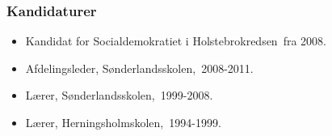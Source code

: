 \documentclass[11pt, a4paper]{awesome-cv}
\begin{document}
\begin{cvletter}
\subsubsection*{Kandidaturer}
\begin{itemize}
\item Kandidat for Socialdemokratiet i Holstebrokredsen fra 2008.
\end{itemize}
\begin{itemize}
\item Afdelingsleder, Sønderlandsskolen, 2008-2011.
\item Lærer, Sønderlandsskolen, 1999-2008.
\item Lærer, Herningsholmskolen, 1994-1999.
\end{itemize}
\end{cvletter}
\end{document}
